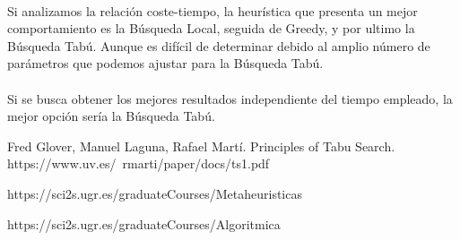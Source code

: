 \documentclass{article}
\begin{document}
		\paragraph{}Si analizamos la relación coste-tiempo, la heurística que presenta un mejor comportamiento es la Búsqueda Local, seguida de Greedy, y por ultimo la Búsqueda Tabú. Aunque es difícil de determinar debido al amplio número de parámetros que podemos ajustar para la Búsqueda Tabú.
		
		\paragraph{}Si se busca obtener los mejores resultados independiente del tiempo empleado, la mejor opción sería la Búsqueda Tabú.
		

	\begin{thebibliography}{0}
		
		 Fred Glover, Manuel Laguna, Rafael Martí. Principles of Tabu Search. https://www.uv.es/~rmarti/paper/docs/ts1.pdf
		
		 https://sci2s.ugr.es/graduateCourses/Metaheuristicas
		
		https://sci2s.ugr.es/graduateCourses/Algoritmica
		
	\end{thebibliography}
\end{document}
